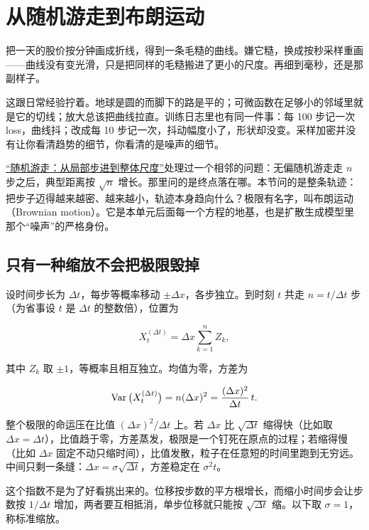 \section{从随机游走到布朗运动}
\label{sec:06-Random-Processes/06-Diffusion-and-SDE/01}

把一天的股价按分钟画成折线，得到一条毛糙的曲线。嫌它糙，换成按秒采样重画——曲线没有变光滑，只是把同样的毛糙搬进了更小的尺度。再细到毫秒，还是那副样子。

这跟日常经验拧着。地球是圆的而脚下的路是平的；可微函数在足够小的邻域里就是它的切线；放大总该把曲线拉直。训练日志里也有同一件事：每 100 步记一次 loss，曲线抖；改成每 10 步记一次，抖动幅度小了，形状却没变。采样加密并没有让你看清趋势的细节，你看清的是噪声的细节。

\hyperref[sec:06-Random-Processes/04-Applications/01]{``随机游走：从局部步进到整体尺度''}处理过一个相邻的问题：无偏随机游走走 \(n\) 步之后，典型距离按 \(\sqrt n\) 增长。那里问的是终点落在哪。本节问的是整条轨迹：把步子迈得越来越密、越来越小，轨迹本身趋向什么？极限有名字，叫布朗运动（Brownian motion）。它是本单元后面每一个方程的地基，也是扩散生成模型里那个``噪声''的严格身份。

\subsection{只有一种缩放不会把极限毁掉}

设时间步长为 \(\Delta t\)，每步等概率移动 \(\pm\Delta x\)，各步独立。到时刻 \(t\) 共走 \(n=t/\Delta t\) 步（为省事设 \(t\) 是 \(\Delta t\) 的整数倍），位置为

\[
X^{(\Delta t)}_t=\Delta x\sum_{k=1}^{n}Z_k,
\]

其中 \(Z_k\) 取 \(\pm1\)，等概率且相互独立。均值为零，方差为

\[
\operatorname{Var}\big(X^{(\Delta t)}_t\big)=n(\Delta x)^2=\frac{(\Delta x)^2}{\Delta t}\,t.
\]

整个极限的命运压在比值 \((\Delta x)^2/\Delta t\) 上。若 \(\Delta x\) 比 \(\sqrt{\Delta t}\) 缩得快（比如取 \(\Delta x=\Delta t\)），比值趋于零，方差蒸发，极限是一个钉死在原点的过程；若缩得慢（比如 \(\Delta x\) 固定不动只缩时间），比值发散，粒子在任意短的时间里跑到无穷远。中间只剩一条缝：\(\Delta x=\sigma\sqrt{\Delta t}\)，方差稳定在 \(\sigma^2 t\)。

这个指数不是为了好看挑出来的。位移按步数的平方根增长，而缩小时间步会让步数按 \(1/\Delta t\) 增加，两者要互相抵消，单步位移就只能按 \(\sqrt{\Delta t}\) 缩。以下取 \(\sigma=1\)，称标准缩放。


